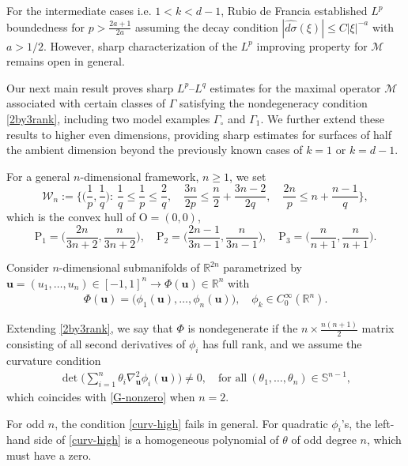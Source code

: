\documentclass[10pt] %
{amsart}
\theoremstyle{plain}
\numberwithin{equation}{section}
\newcommand{\R}{\mathbb R}
\begin{document}
For the intermediate cases i.e. $ 1<  k < d-1$, Rubio de Francia \cite{Ru86} established $L^p$ boundedness for $p >\frac{2a+1}{2a} $ assuming the decay condition $ |\widehat{d\sigma}(\xi)| \le C |\xi|^{-a}$ with $a>1/2$.
However, sharp characterization of the $L^p$ improving property for $\mathcal M$ remains open in general. 

 
Our next main result proves sharp $L^p$--$L^q$ estimates for the maximal operator $\mathcal M$ associated with certain classes of $\Gamma $ satisfying the nondegeneracy condition \eqref{2by3rank}, including two model examples $\Gamma_\circ$ and $\Gamma_1$. 
We further extend these results to higher even dimensions, providing sharp estimates for surfaces of half the ambient dimension beyond the previously known cases of $k=1$ or $k=d-1$.


\bigskip 

For a general $n$-dimensional framework, $n\ge1$, we set
\[
\mathcal W_n:=\Big\{\Big(\frac1p,\frac1q):\,
\frac 1q\le \frac1p \le \frac 2q,\quad
\frac{3n}{2p} \le \frac n2+\frac{3n-2}{2q}, \quad
\frac {2n}p \le n+\frac{n-1}q\Big\},
\]
which is the convex hull of $\mathrm O=(0,0)$, 
\[
\mathrm P_1 =\Big(\frac{2n}{3n+2},\frac n{3n+2}\Big), \quad
\mathrm P_2 = \Big(\frac{2n-1}{3n-1},\frac{n}{3n-1}\Big),\quad
\mathrm P_3 = \Big(\frac n{n+1},\frac {n}{n+1}\Big).
\] 

Consider $n$-dimensional submanifolds of $\mathbb R^{2n}$ parametrized by $\mathbf u=(u_1,\dots,u_n)\in [-1,1]^n \rightarrow \Phi (\mathbf u)\in\R^n$ with
\begin{align*} 
\Phi(\mathbf u)=\big(\phi_1(\mathbf u),\dots,\phi_n(\mathbf u) \big), \quad \phi_k\in C_0^\infty(\mathbb R^n)  .
\end{align*}

Extending \eqref{2by3rank}, we say that $\Phi$ is nondegenerate if the $n \times \frac{n(n+1)}2$ matrix consisting of all second derivatives of $\phi_i$ has full rank, and we assume the curvature condition
\begin{align}\label{curv-high}
\det\Big(\sum_{i=1}^n \theta_i \nabla_{\mathbf u}^2 \phi_i(\mathbf u) \Big) \neq 0,
\quad \text{for all} ~ ( \theta_1,\dots,\theta_n )\in \mathbb S^{n-1},
\end{align}
which coincides with \eqref{G-nonzero} when $n=2$.

For odd $n$, the condition \eqref{curv-high} fails in general. For quadratic $\phi_i$'s, the left-hand side of \eqref{curv-high}  is a homogeneous polynomial of $\theta$ of odd degree $n$, which must have a zero.
\end{document}
